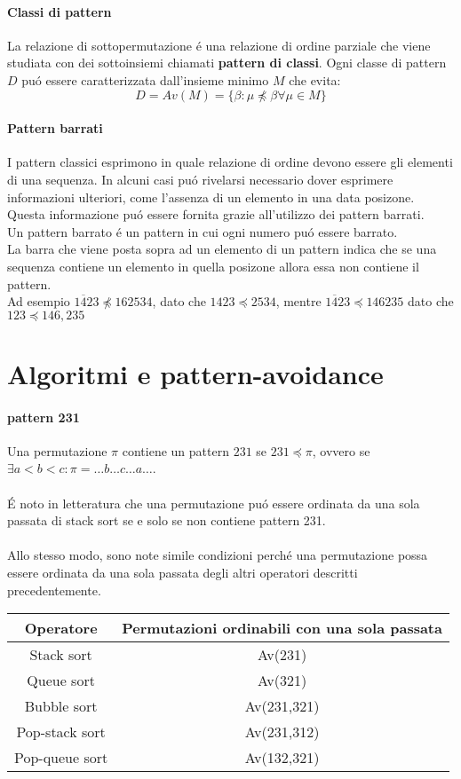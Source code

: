 \paragraph*{Classi di pattern} La relazione di sottopermutazione \'e una relazione di ordine parziale che viene studiata con dei sottoinsiemi chiamati \textbf{pattern di classi}. Ogni classe di pattern $D$ pu\'o essere caratterizzata dall'insieme minimo $M$ che evita:$$ D = Av(M) = \{\beta:\mu\not\preceq\beta\forall\mu\in M\}$$
\paragraph*{Pattern barrati} I pattern classici esprimono in quale relazione di ordine devono essere gli elementi di una sequenza. In alcuni casi pu\'o rivelarsi necessario dover esprimere informazioni ulteriori, come l'assenza di un elemento in una data posizone. Questa informazione pu\'o essere fornita grazie all'utilizzo dei pattern barrati.\\
Un pattern barrato \'e un pattern in cui ogni numero pu\'o essere barrato.
\\La barra che viene posta sopra ad un elemento di un pattern indica che se una sequenza contiene un elemento in quella posizone allora essa non contiene il pattern.\\Ad esempio $1\overline{4}23\not\preceq 162534$, dato che $1423 \preceq 2534$, mentre $1\overline{4}23\preceq146235$ dato che $123\preceq146,235$
\section*{Algoritmi e pattern-avoidance}
\paragraph*{pattern 231}Una permutazione $\pi$ contiene un pattern $231$ se $231\preceq\pi$, ovvero se $\exists a<b<c: \pi =\dots{b}\dots{c}\dots{a}\dots$.\\\\
\'E noto in letteratura \cite{limbrief} che una permutazione pu\'o essere ordinata da una sola passata di stack sort se e solo se non contiene pattern 231.\\\\
Allo stesso modo, sono note simile condizioni perch\'e una permutazione possa essere ordinata da una sola passata degli altri operatori descritti precedentemente.
\begin{center}
\begin{tabular}{ |c|c| } 
\hline
\textbf{Operatore} & \textbf{Permutazioni ordinabili con una sola passata} \\ 
\hline
Stack sort & Av(231)\\ 
Queue sort & Av(321)\\ 
Bubble sort & Av(231,321)\\ 
Pop-stack sort & Av(231,312)\\ 
Pop-queue sort& Av(132,321)\\ 
\hline
\end{tabular}
\end{center}
